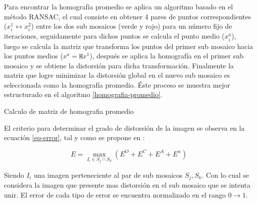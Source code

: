 Para encontrar la homografía promedio se aplica un algoritmo basado en el método RANSAC, el cual consiste en obtener 4 pares de puntos correspondientes ($x^1_i   \leftrightarrow x^2_i$) entre los dos sub mosaicos (verde y rojo) para un número fijo de iteraciones, seguidamente para dichos puntos se calcula el punto medio ($x^a_i$), luego se calcula la matriz que transforma los puntos del primer sub mosaico hacia los puntos medios ($x^a = \mathtt{H}x^1$), después se aplica la homografía en el primer sub mosaico y se obtiene la distorsión para dicha transformación. Finalmente la matriz que logre minimizar la distorsión global en el nuevo sub mosaico es seleccionada como la homografía promedio. Éste proceso se muestra mejor estructurado en el algoritmo \ref{homografia-promedio}.


\begin{spacing}{0.8}
	\begin{algorithm}[h] %
		\caption{Calculo de matriz de homografia promedio}
		\label{homografia-promedio}
		\SetAlgoLined
\end{algorithm}
\end{spacing}

El criterio para determinar el grado de distorsión de la imagen se observa en la ecuación \ref{eq-error}, tal y como se propone en \cite{bellavia-ref}:

\begin{equation}
E = \max\limits_{I_i\in S_j\cap S_k} (E^O + E^C + E^A + E^\alpha)
\label{eq-error}
\end{equation}


Siendo $I_i$ una imagen perteneciente al par de sub mosaicos $S_j,S_k$. Con lo cual se considera la imagen que presente mas distorsión en el sub mosaico que se intenta unir. El error de cada tipo de error se encuentra normalizado en el rango $0\to 1$. 

